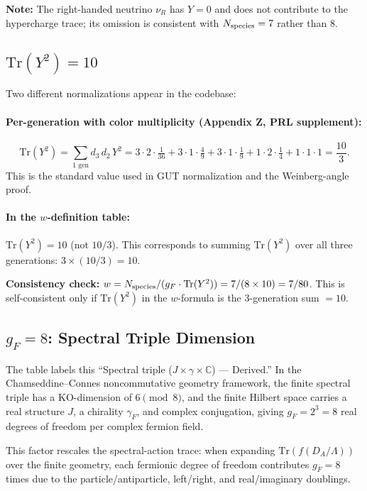 \documentclass[11pt]{article}
\begin{document}
\textbf{Note:} The right-handed neutrino $\nu_R$ has $Y = 0$ and does not
contribute to the hypercharge trace; its omission is consistent with
$N_{\rm species} = 7$ rather than 8.

\subsection{$\mathrm{Tr}(Y^2) = 10$}

Two different normalizations appear in the codebase:

\paragraph{Per-generation with color multiplicity (Appendix Z, PRL supplement):}
\begin{equation}
\mathrm{Tr}(Y^2) = \sum_{\text{1 gen}} d_3\, d_2\, Y^2
= 3\cdot2\cdot\tfrac{1}{36} + 3\cdot1\cdot\tfrac{4}{9}
+ 3\cdot1\cdot\tfrac{1}{9} + 1\cdot2\cdot\tfrac{1}{4}
+ 1\cdot1\cdot1
= \frac{10}{3}.
\end{equation}
This is the standard value used in GUT normalization and the Weinberg-angle
proof.

\paragraph{In the $w$-definition table:}
$\mathrm{Tr}(Y^2) = 10$ (not $10/3$).  This corresponds to summing
$\mathrm{Tr}(Y^2)$ over all three generations:
$3 \times (10/3) = 10$.

\textbf{Consistency check:}
$w = N_{\rm species}/(g_F \cdot \mathrm{Tr}(Y^2))
= 7/(8 \times 10) = 7/80$.
This is self-consistent only if $\mathrm{Tr}(Y^2)$ in the $w$-formula
is the 3-generation sum $= 10$.

\subsection{$g_F = 8$: Spectral Triple Dimension}

The table labels this ``Spectral triple ($J \times \gamma \times \mathbb{C}$) ---
Derived.'' In the Chamseddine--Connes noncommutative geometry framework, the
finite spectral triple has a KO-dimension of $6 \pmod{8}$, and the finite
Hilbert space carries a real structure $J$, a chirality $\gamma_F$, and complex
conjugation, giving $g_F = 2^3 = 8$ real degrees of freedom per complex
fermion field.

This factor rescales the spectral-action trace: when expanding $\mathrm{Tr}(f(D_A/\Lambda))$
over the finite geometry, each fermionic degree of freedom contributes
$g_F = 8$ times due to the particle/antiparticle, left/right, and
real/imaginary doublings.
\end{document}
